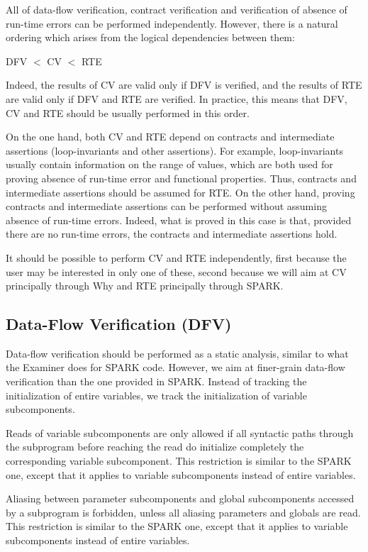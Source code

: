 \documentclass{article}
\newcounter{example}
\begin{document}
All of data-flow verification, contract verification and verification of
absence of run-time errors can be performed independently. However, there is a
natural ordering which arises from the logical dependencies between them: 
\begin{center}
  DFV $<$ CV $<$ RTE
\end{center}

Indeed, the results of CV are valid only if DFV is verified, and the results of
RTE are valid only if DFV and RTE are verified. In practice, this means that
DFV, CV and RTE should be usually performed in this order.

On the one hand, both CV and RTE depend on contracts and intermediate
assertions (loop-invariants and other assertions). For example, loop-invariants
usually contain information on the range of values, which are both used for
proving absence of run-time error and functional properties. Thus, contracts
and intermediate assertions should be assumed for RTE. On the other hand,
proving contracts and intermediate assertions can be performed without assuming
absence of run-time errors. Indeed, what is proved in this case is that,
provided there are no run-time errors, the contracts and intermediate
assertions hold.

It should be possible to perform CV and RTE independently, first because the
user may be interested in only one of these, second because we will aim at CV
principally through Why and RTE principally through SPARK.

\subsection{Data-Flow Verification (DFV)}
\label{sub:DFV}

Data-flow verification should be performed as a static analysis, similar to
what the Examiner does for SPARK code. However, we aim at finer-grain data-flow
verification than the one provided in SPARK. Instead of tracking the
initialization of entire variables, we track the initialization of variable
subcomponents.

Reads of variable subcomponents are only allowed if all syntactic paths through
the subprogram before reaching the read do initialize completely the
corresponding variable subcomponent. This restriction is similar to the SPARK
one, except that it applies to variable subcomponents instead of entire
variables.

Aliasing between parameter subcomponents and global subcomponents accessed by
a subprogram is forbidden, unless all aliasing parameters and globals are
read. This restriction is similar to the SPARK one, except that it applies to
variable subcomponents instead of entire variables.
\end{document}
